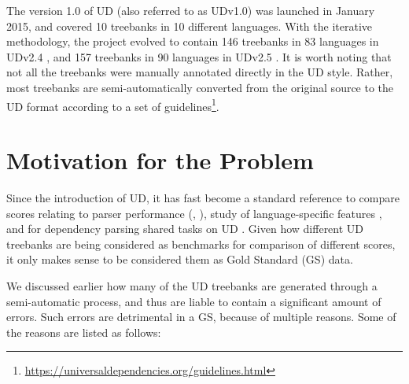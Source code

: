 The version 1.0 of UD (also referred to as UDv1.0) \citep{UDv1.0} was launched in January 2015, and covered 10 treebanks in 10 different languages. With the iterative methodology, the project evolved to contain 146 treebanks in 83 languages in UDv2.4 \citep{UDv2.4}, and 157 treebanks in 90 languages in UDv2.5 \citep{UDv2.5}. It is worth noting that not all the treebanks were manually annotated directly in the UD style. Rather, most treebanks are semi-automatically converted from the original source to the UD format according to a set of guidelines\footnote{\url{https://universaldependencies.org/guidelines.html}}.

\section{Motivation for the Problem}

Since the introduction of UD, it has fast become a standard reference to compare scores relating to parser performance (\cite{parser-performance1}, \cite{parser-performance2}), study of language-specific features \citep{language-study}, and for dependency parsing shared tasks on UD \citep{ud-shared-task}. Given how different UD treebanks are being considered as benchmarks for comparison of different scores, it only makes sense to be considered them as Gold Standard (GS) data.

We discussed earlier how many of the UD treebanks are generated through a semi-automatic process, and thus are liable to contain a significant amount of errors. Such errors are detrimental in a GS, because of multiple reasons. Some of the reasons are listed as follows:

